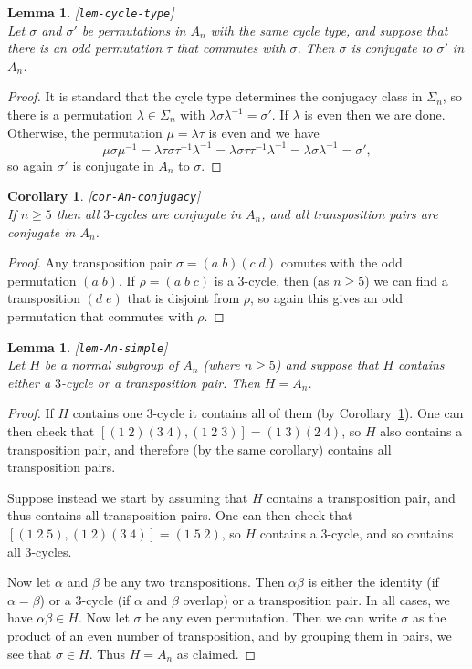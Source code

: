 \documentclass{amsart}
\newcommand{\lbl}[1]{\label{#1}\textup{[\texttt{#1}]}\ \\}
\newcommand{\lbl}{\label}
\newcommand{\al}        {\alpha}
\newcommand{\bt}        {\beta}
\newcommand{\lm}        {\lambda}
\newcommand{\sg}        {\sigma}
\newcommand{\Sg}        {\Sigma}
\renewcommand{\:}{\colon}
\newtheorem{lemma}[theorem]{Lemma}
\newtheorem{corollary}[theorem]{Corollary}
\theoremstyle{definition}
\begin{document}
\begin{lemma}\lbl{lem-cycle-type}
 Let $\sg$ and $\sg'$ be permutations in $A_n$ with the same cycle
 type, and suppose that there is an odd permutation $\tau$ that
 commutes with $\sg$.  Then $\sg$ is conjugate to $\sg'$ in $A_n$.
\end{lemma}
\begin{proof}
 It is standard that the cycle type determines the conjugacy class in
 $\Sg_n$, so there is a permutation $\lm\in\Sg_n$ with
 $\lm\sg\lm^{-1}=\sg'$.  If $\lm$ is even then we are done.
 Otherwise, the permutation $\mu=\lm\tau$ is even and we have 
 \[ \mu\sg\mu^{-1} = \lm\tau\sg\tau^{-1}\lm^{-1} = 
     \lm\sg\tau\tau^{-1}\lm^{-1} = \lm\sg\lm^{-1} = \sg',
 \]
 so again $\sg'$ is conjugate in $A_n$ to $\sg$.
\end{proof}
\begin{corollary}\lbl{cor-An-conjugacy}
 If $n\geq 5$ then all $3$-cycles are conjugate in $A_n$, and all
 transposition pairs are conjugate in $A_n$.
\end{corollary}
\begin{proof}
 Any transposition pair $\sg=(a\;b)(c\;d)$ comutes with the odd
 permutation $(a\;b)$.  If $\rho=(a\;b\;c)$ is a $3$-cycle, then (as
 $n\geq 5$) we can find a transposition $(d\;e)$ that is disjoint from
 $\rho$, so again this gives an odd permutation that commutes with
 $\rho$.  
\end{proof}

\begin{lemma}\lbl{lem-An-simple}
 Let $H$ be a normal subgroup of $A_n$ (where $n\geq 5$) and suppose
 that $H$ contains either a $3$-cycle or a transposition pair.  Then
 $H=A_n$. 
\end{lemma}
\begin{proof}
 If $H$ contains one $3$-cycle it contains all of them (by
 Corollary~\ref{cor-An-conjugacy}).  One can then
 check that $[(1\;2)(3\;4),(1\;2\;3)]=(1\;3)(2\;4)$, so $H$ also
 contains a transposition pair, and therefore (by the same corollary)
 contains all transposition pairs.  

 Suppose instead we start by assuming that $H$ contains a
 transposition pair, and thus contains all transposition pairs.  One
 can then check that $[(1\;2\;5),(1\;2)(3\;4)]=(1\;5\;2)$, so $H$
 contains a $3$-cycle, and so contains all $3$-cycles.  

 Now let $\al$ and $\bt$ be any two transpositions.  Then $\al\bt$ is
 either the identity (if $\al=\bt$) or a $3$-cycle (if $\al$ and $\bt$
 overlap) or a transposition pair.  In all cases, we have
 $\al\bt\in H$.  Now let $\sg$ be any even permutation.  Then we can
 write $\sg$ as the product of an even number of transposition, and by
 grouping them in pairs, we see that $\sg\in H$.  Thus $H=A_n$ as
 claimed. 
\end{proof}
\end{document}
